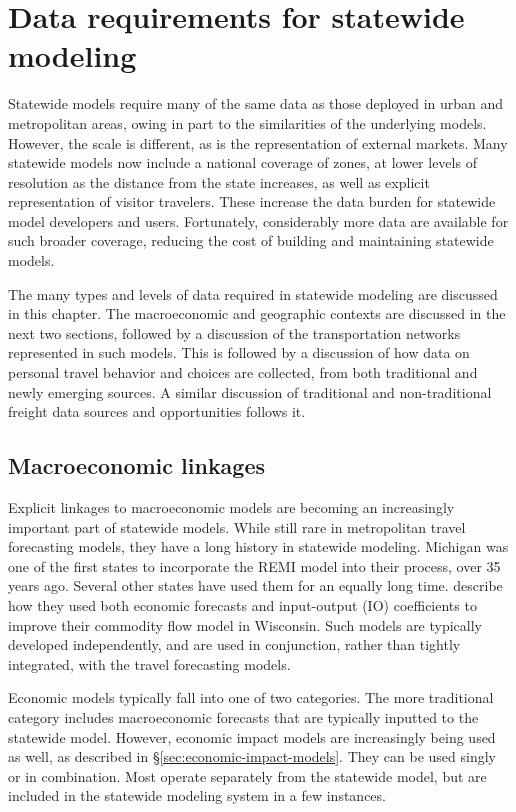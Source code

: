 \chapter{Data requirements for statewide modeling}

Statewide models require many of the same data as those deployed in urban and metropolitan areas, owing in part to the similarities of the underlying models. However, the scale is different, as is the representation of external markets. Many statewide models now include a national coverage of zones, at lower levels of resolution as the distance from the state increases, as well as explicit representation of visitor travelers. These increase the data burden for statewide model developers and users. Fortunately, considerably more data are available for such broader coverage, reducing the cost of building and maintaining statewide models. 

The many types and levels of data required in statewide modeling are discussed in this chapter. The macroeconomic and geographic contexts are discussed in the next two sections, followed by a discussion of the transportation networks represented in such models. This is followed by a discussion of how data on personal travel behavior and choices are collected, from both traditional and newly emerging sources. A similar discussion of traditional and non-traditional freight data sources and opportunities follows it.

\section{Macroeconomic linkages}

Explicit linkages to macroeconomic models are becoming an increasingly important part of state\-wide models. While still rare in metropolitan travel forecasting models, they have a long history in statewide modeling. Michigan was one of the first states to incorporate the REMI model into their process, over 35 years ago. Several other states have used them for an equally long time. \cite{sorratini00} describe how they used both economic forecasts and input-output (IO) coefficients to improve their commodity flow model in Wisconsin. Such models are typically developed independently, and are used in conjunction, rather than tightly integrated, with the travel forecasting models.

Economic models typically fall into one of two categories. The more traditional category includes macroeconomic forecasts that are typically inputted to the statewide model. However, economic impact models are increasingly being used as well, as described in \S\ref{sec:economic-impact-models}. They can be used singly or in combination. Most operate separately from the statewide model, but are included in the statewide modeling system in a few instances.

